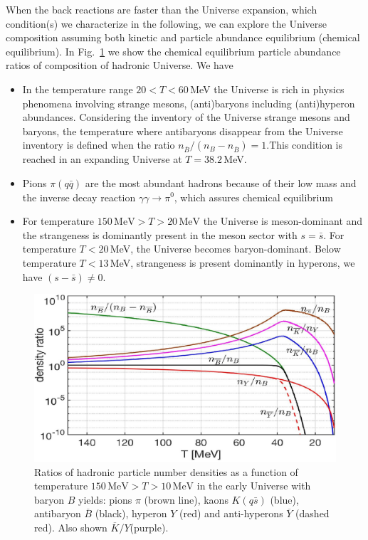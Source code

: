 \documentclass[universe,article,submit,moreauthors,pdftex,a4paper]{Definitions/mdpi}
\begin{document}
When the back reactions are faster than the Universe expansion, which condition(s) we characterize in the following, we can explore the Universe composition assuming both kinetic and particle abundance equilibrium (chemical equilibrium). In Fig.~\ref{EquilibPartRatiosFig} we show the chemical equilibrium particle abundance ratios of composition of hadronic Universe. We have
\begin{itemize}
\item
In the temperature range $20 <T <60$\,MeV the Universe is rich in physics phenomena involving strange mesons, (anti)baryons including (anti)hyperon abundances. Considering the inventory of the Universe strange mesons and baryons, the temperature where antibaryons disappear from the Universe inventory is defined when the ratio $n_{\overline B}/(n_B-n_{\overline B})=1$.This condition is reached in an expanding Universe at $T=38.2$\,MeV. 

\item
Pions $\pi(q\bar q)$ are the most abundant hadrons because of their low mass and the inverse decay reaction $\gamma\gamma\rightarrow\pi^0$, which assures chemical equilibrium~\cite{Kuznetsova:2008jt} %

\item
For temperature $150\,\mathrm{MeV}>T>20\,\mathrm{MeV}$ the Universe is meson-dominant and the strangeness is dominantly present in the meson sector with $s=\bar s$. For temperature $T<20$\,MeV, the Universe becomes baryon-dominant. Below temperature $T<13$\,MeV, strangeness is present dominantly in hyperons, we have $(s -\bar s)\ne 0$.
\end{itemize}
\begin{figure}[bt]
\centering
\includegraphics[width=0.85\linewidth]{Meson_Baryon_density_ratio_C.jpg}
\caption{Ratios of hadronic particle number densities as a function of temperature $150\,\mathrm{MeV}> T>10\,\mathrm{MeV}$ in the early Universe with baryon $B$ yields: pions $\pi$ (brown line), kaons $K( q\bar s)$ (blue), antibaryon $\overline B$ (black), hyperon $Y$ (red) and anti-hyperons $\overline Y$ (dashed red). Also shown $\overline K/Y$(purple).}
\label{EquilibPartRatiosFig}
\end{figure}
\end{document}
